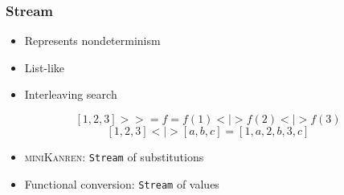 \documentclass[xcolor=table, aspectratio=169]{beamer}
\newcommand{\mk}{\textsc{miniKanren}\xspace}
\begin{document}
\begin{frame}[fragile]
  \frametitle{Stream}

  \begin{center}
    \begin{minipage}{0.4\textwidth}
      \begin{itemize}
          \item Represents nondeterminism
          \item List-like
          \item Interleaving search
      \end{itemize}
    \end{minipage}
  \end{center}

\vfill

  \begin{center}
      \[ \left[1, 2, 3\right] >>= f = f(1) < \mid > f(2) < \mid > f(3)\] 
      \[ \left[1, 2, 3\right] < \mid > \left[a, b, c\right] = \left[1, a, 2, b, 3, c\right] \] 
  \end{center}

  \vfill

  \begin{center}
    \begin{minipage}{0.5\textwidth}
      \begin{itemize}
          \item \mk: \lstinline{Stream} of substitutions
          \item Functional conversion: \lstinline{Stream} of values
      \end{itemize}
    \end{minipage}
  \end{center}
\end{frame}


\end{document}
